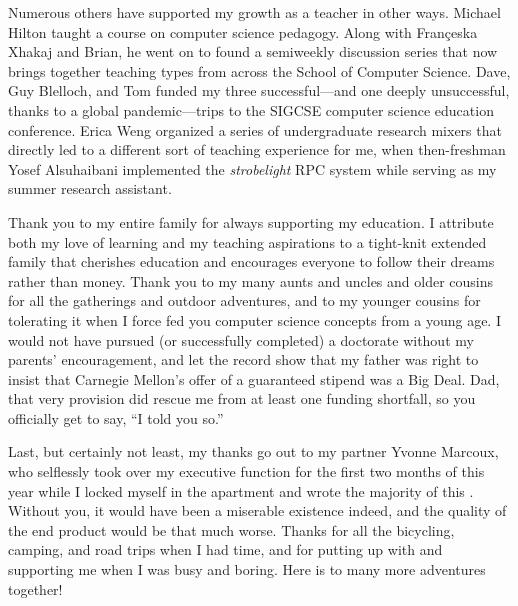 Numerous others have supported my growth as a teacher in other ways.  Michael Hilton
taught a course on computer science pedagogy.  Along with Fran\c{c}eska Xhakaj and
Brian, he went on to found a semiweekly discussion series that now brings together
teaching types from across the School of Computer Science.  Dave, Guy Blelloch, and
Tom funded my three successful---and one deeply unsuccessful, thanks to a global
pandemic---trips to the SIGCSE computer science education conference.  Erica Weng
organized a series of undergraduate research mixers that directly led to a different
sort of teaching experience for me, when then-freshman Yosef Alsuhaibani implemented
the \textit{strobelight} RPC system while serving as my summer research assistant.

Thank you to my entire family for always supporting my education.  I attribute both
my love of learning and my teaching aspirations to a tight-knit extended family that
cherishes education and encourages everyone to follow their dreams rather than money.
Thank you to my many aunts and uncles and older cousins for all the gatherings and
outdoor adventures, and to my younger cousins for tolerating it when I force fed you
computer science concepts from a young age.  I would not have pursued (or
successfully completed) a doctorate without my parents' encouragement, and let the
record show that my father was right to insist that Carnegie Mellon's offer of a
guaranteed stipend was a Big Deal.  Dad, that very provision did rescue me from at
least one funding shortfall, so you officially get to say, ``I told you so.''

Last, but certainly not least, my thanks go out to my partner Yvonne Marcoux, who
selflessly took over my executive function for the first two months of this year
while I locked myself in the apartment and wrote the majority of this \thesis.
Without you, it would have been a miserable existence indeed, and the quality of the
end product would be that much worse.  Thanks for all the bicycling, camping, and
road trips when I had time, and for putting up with and supporting me when I was busy
and boring.  Here is to many more adventures together!
